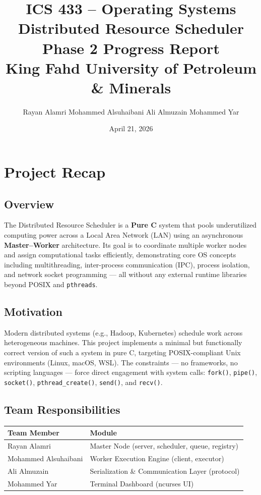 \documentclass[12pt,a4paper]{article}
\title{
    \vspace{-0.5cm}
    \textbf{\large ICS 433 -- Operating Systems} \\[0.4cm]
    \textbf{\LARGE Distributed Resource Scheduler} \\[0.3cm]
    \large Phase 2 Progress Report \\[0.3cm]
    \normalsize King Fahd University of Petroleum \& Minerals
}
\author{
    Rayan Alamri \quad
    Mohammed Alsuhaibani \quad
    Ali Almuzain \quad
    Mohammed Yar
}
\date{April 21, 2026}
\begin{document}
\maketitle
\thispagestyle{fancy}
\tableofcontents
\newpage

\section{Project Recap}

\subsection{Overview}
The Distributed Resource Scheduler is a \textbf{Pure C} system that pools underutilized computing power
across a Local Area Network (LAN) using an asynchronous \textbf{Master--Worker} architecture.
Its goal is to coordinate multiple worker nodes and assign computational tasks efficiently,
demonstrating core OS concepts including multithreading, inter-process communication (IPC),
process isolation, and network socket programming --- all without any external runtime libraries
beyond POSIX and \texttt{pthreads}.

\subsection{Motivation}
Modern distributed systems (e.g., Hadoop, Kubernetes) schedule work across heterogeneous machines.
This project implements a minimal but functionally correct version of such a system in pure C,
targeting POSIX-compliant Unix environments (Linux, macOS, WSL).
The constraints --- no frameworks, no scripting languages --- force direct engagement with
system calls: \texttt{fork()}, \texttt{pipe()}, \texttt{socket()}, \texttt{pthread\_create()},
\texttt{send()}, and \texttt{recv()}.

\subsection{Team Responsibilities}

\begin{center}
\begin{tabular}{ll}
\toprule
\textbf{Team Member} & \textbf{Module} \\
\midrule
Rayan Alamri         & Master Node (server, scheduler, queue, registry) \\
Mohammed Alsuhaibani & Worker Execution Engine (client, executor) \\
Ali Almuzain         & Serialization \& Communication Layer (protocol) \\
Mohammed Yar         & Terminal Dashboard (ncurses UI) \\
\bottomrule
\end{tabular}
\end{center}
\end{document}
